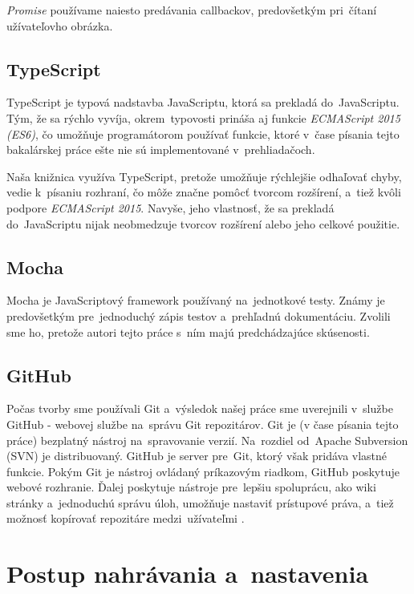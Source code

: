 \emph{Promise} používame naiesto predávania callbackov, predovšetkým pri~čítaní užívateľovho obrázka.

\subsection{TypeScript}

TypeScript je typová nadstavba JavaScriptu, ktorá sa prekladá do~JavaScriptu. Tým, že sa rýchlo vyvíja, okrem~typovosti prináša aj funkcie \emph{ECMAScript 2015 (ES6)}, čo umožňuje programátorom používať funkcie, ktoré v~čase písania tejto bakalárskej práce ešte nie sú implementované v~prehliadačoch.

Naša knižnica využíva TypeScript, pretože umožňuje rýchlejšie odhaľovať chyby, vedie k~písaniu rozhraní, čo môže značne pomôcť tvorcom rozšírení, a~tiež kvôli podpore \emph{ECMAScript 2015}. Navyše, jeho vlastnosť, že sa prekladá do~JavaScriptu nijak neobmedzuje tvorcov rozšírení alebo jeho celkové použitie.

\subsection{Mocha}

Mocha je JavaScriptový framework používaný na~jednotkové testy. Známy je predovšetkým pre~jednoduchý zápis testov a~prehľadnú dokumentáciu. Zvolili sme ho, pretože autori tejto práce s~ním majú predchádzajúce skúsenosti.


\subsection{GitHub}

Počas tvorby sme používali Git a~výsledok našej práce sme uverejnili v~službe GitHub - webovej službe na~správu Git repozitárov. Git je (v čase písania tejto práce) bezplatný nástroj na~spravovanie verzií. Na~rozdiel od~Apache Subversion (SVN) je distribuovaný. GitHub je server pre~Git, ktorý však pridáva vlastné funkcie. Pokým Git je nástroj ovládaný príkazovým riadkom, GitHub poskytuje webové rozhranie. Ďalej poskytuje nástroje pre~lepšiu spoluprácu, ako wiki stránky a~jednoduchú správu úloh, umožňuje nastaviť prístupové práva, a~tiež možnosť kopírovať repozitáre medzi~užívateľmi \cite{Git_TechCrunch}. 


\section{Postup nahrávania a~nastavenia}
\label{sec:upload-and-settings}

